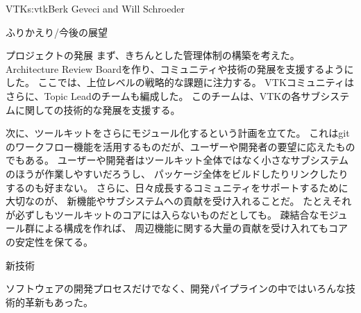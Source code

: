 \begin{aosachapter}{VTK}{s:vtk}{Berk Geveci and Will Schroeder}
\begin{aosasect1}{ふりかえり/今後の展望}
\begin{aosasect2}{プロジェクトの発展}
まず、きちんとした管理体制の構築を考えた。
Architecture Review Boardを作り、コミュニティや技術の発展を支援するようにした。
ここでは、上位レベルの戦略的な課題に注力する。
VTKコミュニティはさらに、Topic Leadのチームも編成した。
このチームは、VTKの各サブシステムに関しての技術的な発展を支援する。

次に、ツールキットをさらにモジュール化するという計画を立てた。
これはgitのワークフロー機能を活用するものだが、ユーザーや開発者の要望に応えたものでもある。
ユーザーや開発者はツールキット全体ではなく小さなサブシステムのほうが作業しやすいだろうし、
パッケージ全体をビルドしたりリンクしたりするのも好まない。
さらに、日々成長するコミュニティをサポートするために大切なのが、
新機能やサブシステムへの貢献を受け入れることだ。
たとえそれが必ずしもツールキットのコアには入らないものだとしても。
疎結合なモジュール群による構成を作れば、
周辺機能に関する大量の貢献を受け入れてもコアの安定性を保てる。

\end{aosasect2}

\begin{aosasect2}{新技術}

ソフトウェアの開発プロセスだけでなく、開発パイプラインの中ではいろんな技術的革新もあった。

\begin{aosaitemize}


\end{aosaitemize}
\end{aosasect2}
\end{aosasect1}
\end{aosachapter}
